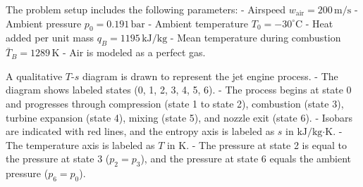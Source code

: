 The problem setup includes the following parameters:  
- Airspeed \( w_{\text{air}} = 200 \, \text{m/s} \)  
- Ambient pressure \( p_0 = 0.191 \, \text{bar} \)  
- Ambient temperature \( T_0 = -30^\circ\text{C} \)  
- Heat added per unit mass \( q_B = 1195 \, \text{kJ/kg} \)  
- Mean temperature during combustion \( \bar{T}_B = 1289 \, \text{K} \)  
- Air is modeled as a perfect gas.  

A qualitative \( T \)-\( s \) diagram is drawn to represent the jet engine process.  
- The diagram shows labeled states (0, 1, 2, 3, 4, 5, 6).  
- The process begins at state 0 and progresses through compression (state 1 to state 2), combustion (state 3), turbine expansion (state 4), mixing (state 5), and nozzle exit (state 6).  
- Isobars are indicated with red lines, and the entropy axis is labeled as \( s \) in \( \text{kJ/kg·K} \).  
- The temperature axis is labeled as \( T \) in \( \text{K} \).  
- The pressure at state 2 is equal to the pressure at state 3 (\( p_2 = p_3 \)), and the pressure at state 6 equals the ambient pressure (\( p_6 = p_0 \)).